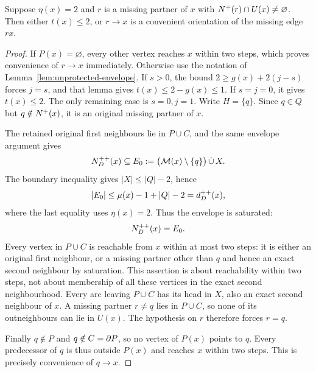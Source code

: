 \begin{lemma}\label{lem:eta-two-dichotomy}
Suppose $\eta(x)=2$ and $r$ is a missing partner of $x$ with
$N^+(r)\cap U(x)\ne\varnothing$. Then either $t(x)\le2$, or
$r\to x$ is a convenient orientation of the missing edge $rx$.
\end{lemma}
\begin{proof}
If $P(x)=\varnothing$, every other vertex reaches $x$ within two steps,
which proves convenience of $r\to x$ immediately.
Otherwise use the notation of Lemma~\ref{lem:unprotected-envelope}.
If $s>0$, the bound
$2\ge g(x)+2(j-s)$ forces $j=s$, and that lemma gives
$t(x)\le2-g(x)\le1$. If $s=j=0$, it gives $t(x)\le2$.
The only remaining case is $s=0,j=1$. Write $H=\{q\}$.
Since $q\in Q$ but $q\notin N^+(x)$, it is an original missing
partner of $x$.

The retained original first neighbours lie in $P\cup C$, and the
same envelope argument gives
\[
 N^{++}_D(x)\subseteq
 E_0:=\bigl(\mathcal M(x)\setminus\{q\}\bigr)\,\dot\cup\,X.
\]
The boundary inequality gives $|X|\le|Q|-2$, hence
\[
 |E_0|\le\mu(x)-1+|Q|-2
          =d^{++}_D(x),
\]
where the last equality uses $\eta(x)=2$. Thus the envelope is
saturated:
\[
 N^{++}_D(x)=E_0.
\]
Every vertex in $P\cup C$ is reachable from $x$ within at most two
steps: it is either an original first neighbour, or a missing partner
other than $q$ and hence an exact second neighbour by saturation.
This assertion is about reachability within two steps, not about
membership of all these vertices in the exact second neighbourhood.
Every arc leaving $P\cup C$ has its head in $X$, also an exact second
neighbour of $x$. A missing partner $r\ne q$ lies in $P\cup C$,
so none of its outneighbours can lie in $U(x)$. The hypothesis on $r$
therefore forces $r=q$.

Finally $q\notin P$ and $q\notin C=\partial P$, so no vertex of $P(x)$
points to $q$. Every predecessor of $q$ is thus outside $P(x)$ and
reaches $x$ within two steps. This is precisely convenience of
$q\to x$.
\end{proof}
